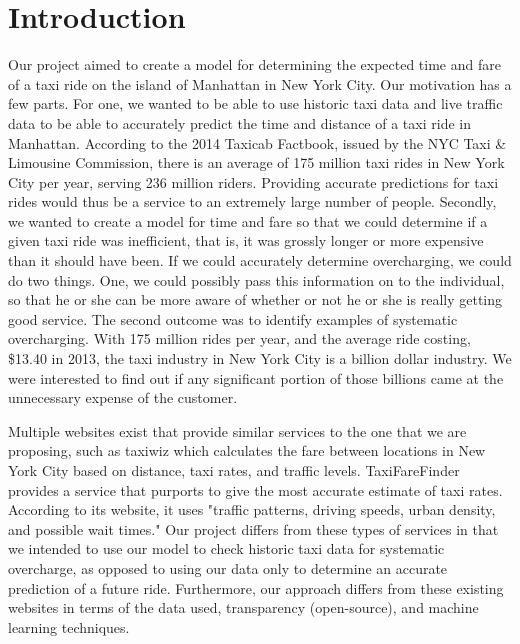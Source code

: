 \documentclass{sig-alternate}
\begin{document}
\section{Introduction}
Our project aimed to create a model for determining the expected time and fare of a taxi ride on the island of Manhattan in New York City.  Our motivation has a few parts.  For one, we wanted to be able to use historic taxi data and live traffic data to be able to accurately predict the time and distance of a taxi ride in Manhattan.  According to the 2014 Taxicab Factbook, issued by the NYC Taxi & Limousine Commission, there is an average of 175 million taxi rides in New York City per year, serving 236 million riders\cite{taxicabfactbook}.  Providing accurate predictions for taxi rides would thus be a service to an extremely large number of people.  Secondly, we wanted to create a model for time and fare so that we could determine if a given taxi ride was inefficient, that is, it was grossly longer or more expensive than it should have been. If we could accurately determine overcharging, we could do two things.  One, we could possibly pass this information on to the individual, so that he or she can be more aware of whether or not he or she is really getting good service.  The second outcome was to identify examples of systematic overcharging.  With 175 million rides per year, and the average ride costing, \$13.40 in 2013, the taxi industry in New York City is a billion dollar industry\cite{taxicabfactbook}.  We were interested to find out if any significant portion of those billions came at the unnecessary expense of the customer.

Multiple websites exist that provide similar services to the one that we are proposing, such as taxiwiz which calculates the fare between locations in New York City based on distance, taxi rates, and traffic levels.  TaxiFareFinder provides a service that purports to give the most accurate estimate of taxi rates.  According to its website, it uses "traffic patterns, driving speeds, urban density, and possible wait times."\cite{taxifarefinder}  Our project differs from these types of services in that we intended to use our model to check historic taxi data for systematic overcharge, as opposed to using our data only to determine an accurate prediction of a future ride.  Furthermore, our approach differs from these existing websites in terms of the data used, transparency (open-source), and machine learning techniques.
\end{document}
